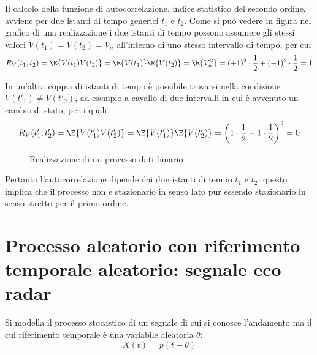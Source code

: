 Il calcolo della funzione di autocorrelazione, indice statistico del secondo ordine, avviene per due istanti di tempo generici $t_1$ e $t_2$. Come si può vedere in figura nel grafico di una realizzazione i due istanti di tempo possono assumere gli stessi valori $V(t_1)=V(t_2)=V_n$ all'interno di uno stesso intervallo di tempo, per cui
\begin{equation}
	R_V(t_1,t_2)=\E{V(t_1)V(t_2)}=\E{V(t_1)}\E{V(t_2)}=\E{V_n^2}=(+1)^2\cdot\frac{1}{2}+(-1)^2\cdot\frac{1}{2}=1
\end{equation}

In un'altra coppia di istanti di tempo è possibile trovarsi nella condizione $V(t'_1)\neq V(t'_2)$, ad esempio a cavallo di due intervalli in cui è avvenuto un cambio di stato, per i quali
\begin{equation}
	R_V(t'_1,t'_2)=\E{V(t'_1)V(t'_2)}=\E{V(t'_1)}\E{V(t'_2)}=\left(1\cdot\frac{1}{2}-1\cdot\frac{1}{2}\right)^2=0
\end{equation}
\begin{figure}[!h]
	\centering
	\caption{Realizzazione di un processo dati binario}
	\label{fig:processo_dati_binario}
\end{figure}

Pertanto l'autocorrelazione dipende dai due istanti di tempo $t_1$ e $t_2$, questo implica che il processo non è stazionario in senso lato pur essendo stazionario in senso stretto per il primo ordine.

\section[Processo aleatorio con riferimento temporale aleatorio]{Processo aleatorio con riferimento temporale aleatorio: segnale eco radar}
Si modella il processo stocastico di un segnale di cui si conosce l'andamento ma il cui riferimento temporale è una variabile aleatoria $\theta$:
\begin{equation}
	X(t)=p(t-\theta)
\end{equation}

